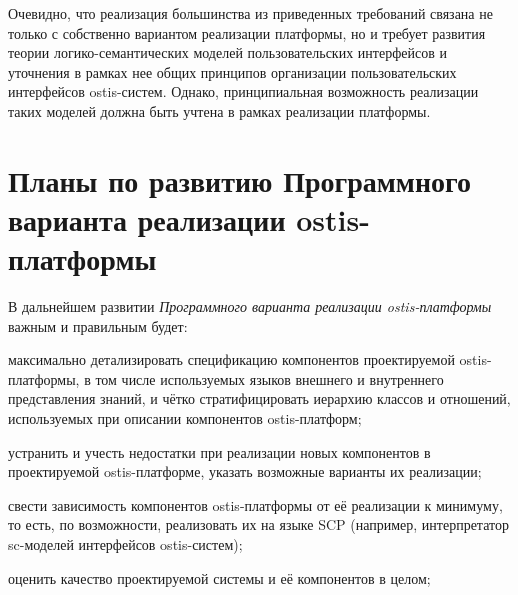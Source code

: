 Очевидно, что реализация большинства из приведенных требований связана не только с собственно вариантом реализации платформы, но и требует развития теории логико-семантических моделей пользовательских интерфейсов и уточнения в рамках нее общих принципов организации пользовательских интерфейсов ostis-систем. Однако, принципиальная возможность реализации таких моделей должна быть учтена в рамках реализации платформы.

\section{Планы по развитию Программного варианта реализации ostis-платформы}
\label{sec_soft_platform_plans_and_tasks}

В дальнейшем развитии \textit{Программного варианта реализации ostis-платформы} важным и правильным будет:
\begin{textitemize}
    \item максимально детализировать спецификацию компонентов проектируемой ostis-платформы, в том числе используемых языков внешнего и внутреннего представления знаний, и чётко стратифицировать иерархию классов и отношений, используемых при описании компонентов ostis-платформ;
    \item устранить и учесть недостатки при реализации новых компонентов в проектируемой ostis-платформе, указать возможные варианты их реализации;
    \item свести зависимость компонентов ostis-платформы от её реализации к минимуму, то есть, по возможности, реализовать их на языке SCP (например, интерпретатор sc-моделей интерфейсов ostis-систем);
    \item оценить качество проектируемой системы и её компонентов в целом;
\end{textitemize}

%